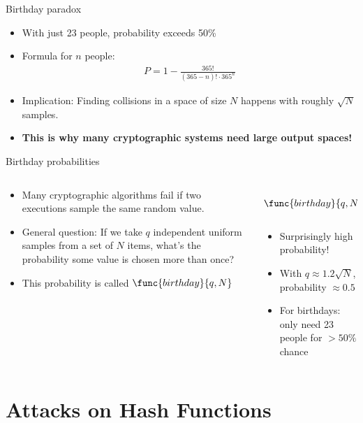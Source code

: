 \documentclass[aspectratio=169, lualatex, handout]{beamer}
\begin{document}
\begin{frame}{Birthday paradox}
	\begin{itemize}
		\item With just 23 people, probability exceeds 50\%
		\item Formula for $n$ people:
		      \begin{align*}
			      P = 1 - \frac{365!}{(365-n)! \cdot 365^n}
		      \end{align*}
		\item Implication: Finding collisions in a space of size $N$ happens with roughly $\sqrt{N}$ samples.
		\item \textbf{This is why many cryptographic systems need large output spaces!}
	\end{itemize}
\end{frame}

\begin{frame}{Birthday probabilities}
	\begin{columns}[c]
		\begin{column}{0.6\textwidth}
			\begin{itemize}
				\item Many cryptographic algorithms fail if two executions sample the same random value.
				\item General question: If we take $q$ independent uniform samples from a set of $N$ items, what's the probability some value is chosen more than once?
				\item This probability is called $\func{birthday}{q,N}$
			\end{itemize}
		\end{column}
		\begin{column}{0.4\textwidth}
			\begin{align*}
				\func{birthday}{q,N} = 1 - \prod_{i=1}^{q-1} \left(1 - \frac{i}{N}\right)
			\end{align*}
			\begin{itemize}
				\item Surprisingly high probability!
				\item With $q \approx 1.2\sqrt{N}$, probability $\approx 0.5$
				\item For birthdays: only need 23 people for $>50\%$ chance
			\end{itemize}
		\end{column}
	\end{columns}
\end{frame}

\section{Attacks on Hash Functions}
\end{document}
